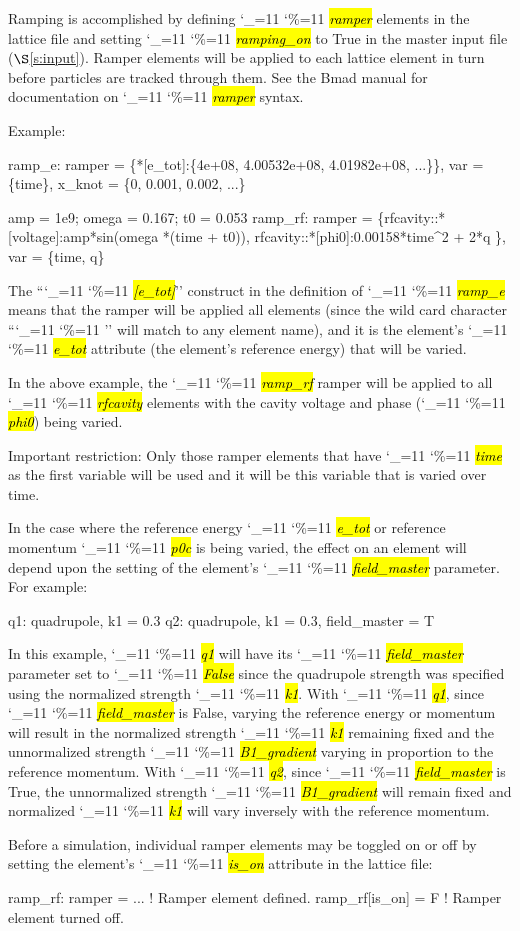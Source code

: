 \documentclass{hitec}
\newcommand\dottcmd[1]{\hl{\em#1}\endgroup}
\newcommand{\vn}{\begingroup\catcode`\_=11 \catcode`\%=11 \dottcmd}
\newcommand{\sref}[1]{$\S$\ref{#1}}
\begin{document}
Ramping is accomplished by defining \vn{ramper} elements in the lattice file and setting
\vn{ramping_on} to True in the master input file (\sref{s:input}). Ramper elements will be applied
to each lattice element in turn before particles are tracked through them. See the Bmad manual for
documentation on \vn{ramper} syntax.

Example:
\begin{code}
  ramp_e: ramper = \{*[e_tot]:\{4e+08, 4.00532e+08, 4.01982e+08, ...\}\},
                var = \{time\}, x_knot = \{0, 0.001, 0.002, ...\}

  amp = 1e9;  omega = 0.167;  t0 = 0.053
  ramp_rf: ramper = \{rfcavity::*[voltage]:amp*sin(omega *(time + t0)),
        rfcavity::*[phi0]:0.00158*time^2 + 2*q \}, var = \{time, q\}
\end{code}
The ``\vn{*[e_tot]}'' construct in the definition of \vn{ramp_e} means that the ramper will be
applied all elements (since the wild card character ``\vn{*}'' will match to any element name), and
it is the element's \vn{e_tot} attribute (the element's reference energy) that will be varied.

In the above example, the \vn{ramp_rf} ramper will be applied to all \vn{rfcavity} elements with
the cavity voltage and phase (\vn{phi0}) being varied.

Important restriction: Only those
ramper elements that have \vn{time} as the first variable will be used and it will be this variable
that is varied over time. 

In the case where the reference energy \vn{e_tot} or reference momentum \vn{p0c} is being varied, the
effect on an element will depend upon the setting of the element's \vn{field_master} parameter. For
example:
\begin{code}
  q1: quadrupole, k1 = 0.3
  q2: quadrupole, k1 = 0.3, field_master = T
\end{code}
In this example, \vn{q1} will have its \vn{field_master} parameter set to \vn{False} since the
quadrupole strength was specified using the normalized strength \vn{k1}. With \vn{q1}, since
\vn{field_master} is False, varying the reference energy or momentum will result in the normalized
strength \vn{k1} remaining fixed and the unnormalized strength \vn{B1_gradient} varying in
proportion to the reference momentum. With \vn{q2}, since \vn{field_master} is True, the
unnormalized strength \vn{B1_gradient} will remain fixed and normalized \vn{k1} will vary
inversely with the reference momentum.

Before a simulation, individual ramper elements may be toggled on or off by setting the element's
\vn{is_on} attribute in the lattice file: 
\begin{code}
  ramp_rf: ramper = ...  ! Ramper element defined.
  ramp_rf[is_on] = F     ! Ramper element turned off.
\end{code}
\end{document}
